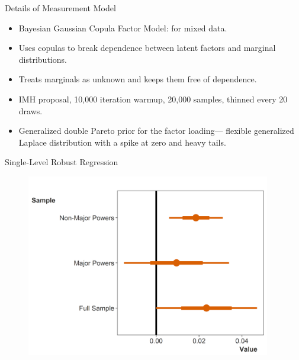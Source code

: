 \documentclass{beamer}
\begin{document}

\begin{frame}{Details of Measurement Model}

\begin{itemize}
\item Bayesian Gaussian Copula Factor Model: for mixed data. 
\item Uses copulas to break dependence between latent factors and marginal distributions. 
\item Treats marginals as unknown and keeps them free of dependence. 
\item IMH proposal, 10,000 iteration warmup, 20,000 samples, thinned every 20 draws. 
\item Generalized double Pareto prior for the factor loading--- flexible generalized Laplace distribution with a spike at zero and heavy tails. 
\end{itemize} 


\end{frame}




\begin{frame}{Single-Level Robust Regression}

\begin{figure}[htbp]
	\centering
		\includegraphics[width=0.95\textwidth]{robust-reg-coef.png}
	\label{fig:robust-reg-coef}
\end{figure}



\end{frame}



\end{document}

